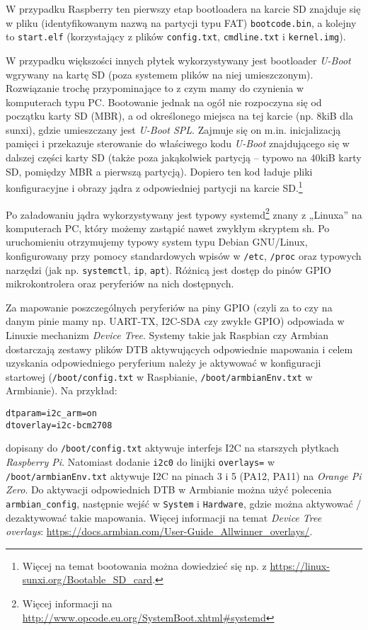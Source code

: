 W przypadku Raspberry ten pierwszy etap bootloadera na karcie SD znajduje się w pliku (identyfikowanym nazwą na partycji typu FAT) \Verb$bootcode.bin$,
	a kolejny to \Verb$start.elf$ (korzystający z plików \Verb$config.txt$, \Verb$cmdline.txt$ i \Verb$kernel.img$).

W przypadku większości innych płytek wykorzystywany jest bootloader \textit{U-Boot} wgrywany na kartę SD (poza systemem plików na niej umieszczonym).
Rozwiązanie trochę przypominające to z czym mamy do czynienia w komputerach typu PC.
Bootowanie jednak na ogół nie rozpoczyna się od początku karty SD (MBR), a od określonego miejsca na tej karcie (np. 8kiB dla sunxi), gdzie umieszczany jest \textit{U-Boot SPL}.
Zajmuje się on m.in. inicjalizacją pamięci i przekazuje sterowanie do właściwego kodu \textit{U-Boot} znajdującego się w dalszej części karty SD (także poza jakąkolwiek partycją – typowo na 40kiB karty SD, pomiędzy MBR a pierwszą partycją).
Dopiero ten kod ładuje pliki konfiguracyjne i obrazy jądra z odpowiedniej partycji na karcie SD.\footnote{Więcej na temat bootowania można dowiedzieć się np. z \url{https://linux-sunxi.org/Bootable_SD_card}.}

\vspace{7pt}

Po załadowaniu jądra wykorzystywany jest typowy systemd\footnote{Więcej informacji na \url{http://www.opcode.eu.org/SystemBoot.xhtml\#systemd}} znany z „Linuxa” na komputerach PC, który możemy zastąpić nawet zwykłym skryptem sh.
Po uruchomieniu otrzymujemy typowy system typu Debian GNU/Linux, konfigurowany przy pomocy standardowych wpisów w \Verb$/etc$, \Verb$/proc$ oraz typowych narzędzi (jak np. \Verb$systemctl$, \Verb$ip$, \Verb$apt$).
Różnicą jest dostęp do pinów GPIO mikrokontrolera oraz peryferiów na nich dostępnych.

Za mapowanie poszczególnych peryferiów na piny GPIO (czyli za to czy na danym pinie mamy np. UART-TX, I2C-SDA czy zwykłe GPIO) odpowiada w Linuxie mechanizm \textit{Device Tree}.
Systemy takie jak Raspbian czy Armbian dostarczają zestawy plików DTB aktywujących odpowiednie mapowania i celem uzyskania odpowiedniego peryferium należy je aktywować w konfiguracji startowej (\Verb$/boot/config.txt$ w Raspbianie, \Verb$/boot/armbianEnv.txt$ w Armbianie).
Na przykład:
\begin{Verbatim}
dtparam=i2c_arm=on
dtoverlay=i2c-bcm2708
\end{Verbatim}
dopisany do \Verb$/boot/config.txt$ aktywuje interfejs I2C na starszych płytkach \textit{Raspberry Pi}. Natomiast dodanie \Verb$i2c0$ do linijki \Verb$overlays=$ w \Verb$/boot/armbianEnv.txt$ aktywuje I2C na pinach 3 i 5 (PA12, PA11) na \textit{Orange Pi Zero}.
Do aktywacji odpowiednich DTB w Armbianie można użyć polecenia \Verb$armbian_config$, następnie wejść w \Verb$System$ i \Verb$Hardware$, gdzie można aktywować / dezaktywować takie mapowania.
Więcej informacji na temat \textit{Device Tree overlays}: \url{https://docs.armbian.com/User-Guide_Allwinner_overlays/}.

